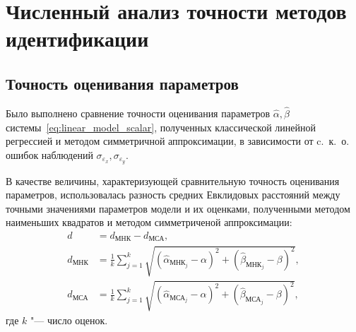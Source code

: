 



\section{Численный анализ точности методов идентификации}

\subsection{Точность оценивания параметров}

Было выполнено сравнение точности оценивания параметров
\( \hat{\alpha}, \hat{\beta} \) системы~\eqref{eq:linear_model_scalar},
полученных классической линейной регрессией и методом симметричной аппроксимации,
в зависимости от c.~к.~о. ошибок наблюдений \( \sigma_{\varepsilon_x}, \sigma_{\varepsilon_y} \).

В качестве величины, характеризующей сравнительную точность оценивания параметров,
использовалась разность средних Евклидовых расстояний
между точными значениями параметров модели и их оценками,
полученными методом наименьших квадратов и методом симметриченой аппроксимации:
\begin{equation*}
  \begin{aligned}
    d &= d_{\text{МНК}} - d_{\text{МСА}}, \\
    d_{\text{МНК}} &= \frac{1}{k} \sum_{j=1}^k \sqrt{(\hat{\alpha}_{\text{МНК}_j} - \alpha)^2 + (\hat{\beta}_{\text{МНК}_j} - \beta)^2}, \\
    d_{\text{МСА}} &= \frac{1}{k} \sum_{j=1}^k \sqrt{(\hat{\alpha}_{\text{МСА}_j} - \alpha)^2 + (\hat{\beta}_{\text{МСА}_j} - \beta)^2},
  \end{aligned}
\end{equation*}
где \( k \) "--- число оценок.

